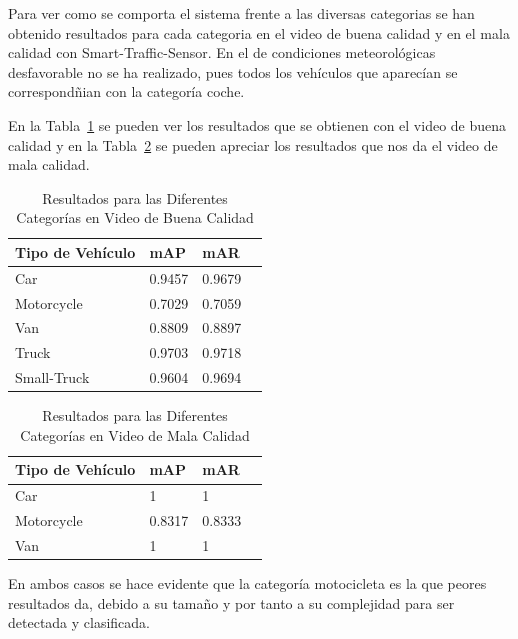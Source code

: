Para ver como se comporta el sistema frente a las diversas categorias se han obtenido resultados para cada categoria en el video de buena calidad y en el mala calidad con Smart-Traffic-Sensor. En el de condiciones meteorológicas desfavorable no se ha realizado, pues todos los vehículos que aparecían se correspondñian con la categoría coche.

En la Tabla~\ref{resultados_categoria_video_buena_calidad} se pueden ver los resultados que se obtienen con el video de buena calidad y en la Tabla~\ref{resultados_categoria_video_mala_calidad} se pueden apreciar los resultados que nos da el video de mala calidad.

\begin{table}[htbp][H] 
\begin{center}
\begin{tabular}{|l|l|l|l|}
\hline
Tipo de Vehículo & mAP & mAR  \\ 
\hline \hline
Car & 0.9457 & 0.9679 \\ \hline
Motorcycle & 0.7029 & 0.7059 \\ \hline
Van & 0.8809 & 0.8897\\ \hline
Truck & 0.9703 & 0.9718\\ \hline
Small-Truck & 0.9604 & 0.9694\\ \hline
\end{tabular}
\caption{Resultados para las Diferentes Categorías en Video de Buena Calidad}
\label{resultados_categoria_video_buena_calidad}
\end{center}
\end{table}

\begin{table}[htbp][H] 
\begin{center}
\begin{tabular}{|l|l|l|l|}
\hline
Tipo de Vehículo & mAP & mAR  \\ 
\hline \hline
Car & 1 & 1 \\ \hline
Motorcycle & 0.8317 & 0.8333 \\ \hline
Van & 1 & 1 \\ \hline
\end{tabular}
\caption{Resultados para las Diferentes Categorías en Video de Mala Calidad}
\label{resultados_categoria_video_mala_calidad}
\end{center}
\end{table}

En ambos casos se hace evidente que la categoría motocicleta es la que peores resultados da, debido a su tamaño y por tanto a su complejidad para ser detectada y clasificada.

